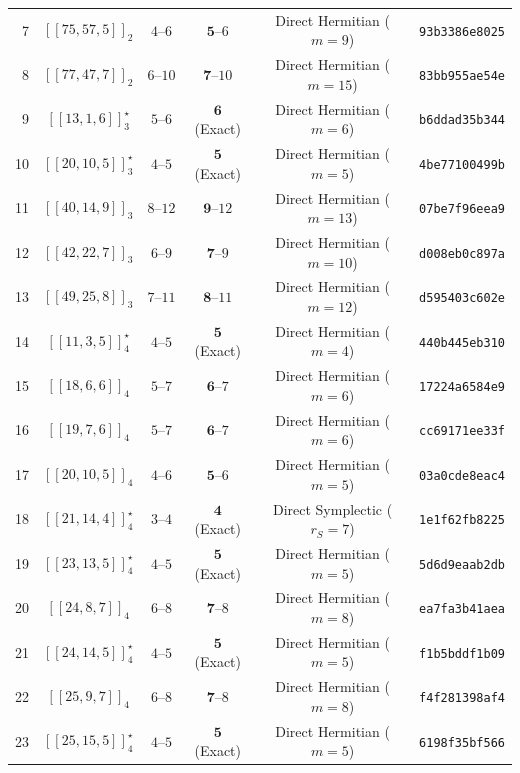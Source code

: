 \documentclass[11pt,a4paper]{article}
\theoremstyle{remark}
\begin{document}
{\begin{longtable}{@{}rccccl@{}}
7 & $[[75,57,5]]_{2}$ & $4\text{--}6$ & $\mathbf{5}\text{--}6$ & Direct Hermitian ($m=9$) & \texttt{93b3386e8025} \\
8 & $[[77,47,7]]_{2}$ & $6\text{--}10$ & $\mathbf{7}\text{--}10$ & Direct Hermitian ($m=15$) & \texttt{83bb955ae54e} \\
\midrule
9 & $[[13,1,6]]_{3}^\star$ & $5\text{--}6$ & $\mathbf{6}$ (Exact) & Direct Hermitian ($m=6$) & \texttt{b6ddad35b344} \\
10 & $[[20,10,5]]_{3}^\star$ & $4\text{--}5$ & $\mathbf{5}$ (Exact) & Direct Hermitian ($m=5$) & \texttt{4be77100499b} \\
11 & $[[40,14,9]]_{3}$ & $8\text{--}12$ & $\mathbf{9}\text{--}12$ & Direct Hermitian ($m=13$) & \texttt{07be7f96eea9} \\
12 & $[[42,22,7]]_{3}$ & $6\text{--}9$ & $\mathbf{7}\text{--}9$ & Direct Hermitian ($m=10$) & \texttt{d008eb0c897a} \\
13 & $[[49,25,8]]_{3}$ & $7\text{--}11$ & $\mathbf{8}\text{--}11$ & Direct Hermitian ($m=12$) & \texttt{d595403c602e} \\
\midrule
14 & $[[11,3,5]]_{4}^\star$ & $4\text{--}5$ & $\mathbf{5}$ (Exact) & Direct Hermitian ($m=4$) & \texttt{440b445eb310} \\
15 & $[[18,6,6]]_{4}$ & $5\text{--}7$ & $\mathbf{6}\text{--}7$ & Direct Hermitian ($m=6$) & \texttt{17224a6584e9} \\
16 & $[[19,7,6]]_{4}$ & $5\text{--}7$ & $\mathbf{6}\text{--}7$ & Direct Hermitian ($m=6$) & \texttt{cc69171ee33f} \\
17 & $[[20,10,5]]_{4}$ & $4\text{--}6$ & $\mathbf{5}\text{--}6$ & Direct Hermitian ($m=5$) & \texttt{03a0cde8eac4} \\
18 & $[[21,14,4]]_{4}^\star$ & $3\text{--}4$ & $\mathbf{4}$ (Exact) & Direct Symplectic ($r_S=7$) & \texttt{1e1f62fb8225} \\
19 & $[[23,13,5]]_{4}^\star$ & $4\text{--}5$ & $\mathbf{5}$ (Exact) & Direct Hermitian ($m=5$) & \texttt{5d6d9eaab2db} \\
20 & $[[24,8,7]]_{4}$ & $6\text{--}8$ & $\mathbf{7}\text{--}8$ & Direct Hermitian ($m=8$) & \texttt{ea7fa3b41aea} \\
21 & $[[24,14,5]]_{4}^\star$ & $4\text{--}5$ & $\mathbf{5}$ (Exact) & Direct Hermitian ($m=5$) & \texttt{f1b5bddf1b09} \\
22 & $[[25,9,7]]_{4}$ & $6\text{--}8$ & $\mathbf{7}\text{--}8$ & Direct Hermitian ($m=8$) & \texttt{f4f281398af4} \\
23 & $[[25,15,5]]_{4}^\star$ & $4\text{--}5$ & $\mathbf{5}$ (Exact) & Direct Hermitian ($m=5$) & \texttt{6198f35bf566} \\

\end{longtable}}
\end{document}
